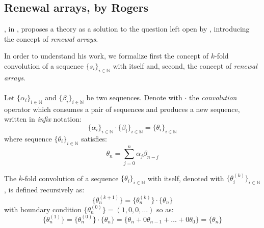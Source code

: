 
\subsection{Renewal arrays, by Rogers}
\label{sec:back:to:the:basics:rogers}

\citeauthor{rogers:1977}, in \cite{rogers:1977}, proposes a theory
as a solution to the question left open by \citeauthor{shapiro:1976}, 
introducing the concept of \emph{renewal arrays}.

In order to understand his work, we formalize first the concept of $k$-fold
convolution of a sequence $\lbrace s_{i}\rbrace_{i\in\mathbb{N}}$ 
with itself and, second, the concept of \emph{renewal arrays}.
\\\\
Let $\lbrace \alpha_{i}\rbrace_{i\in\mathbb{N}}$ and 
$\lbrace \beta_{i}\rbrace_{i\in\mathbb{N}}$ be two sequences. Denote
with $\cdot$ the \emph{convolution} operator which consumes a pair
of sequences and produces a new sequence, written in \emph{infix} 
notation:
\begin{displaymath}
    \lbrace \alpha_{i}\rbrace_{i\in\mathbb{N}}\cdot
    \lbrace \beta_{i}\rbrace_{i\in\mathbb{N}} =
    \lbrace \theta_{i}\rbrace_{i\in\mathbb{N}}
\end{displaymath}
where sequence  $\lbrace \theta_{i}\rbrace_{i\in\mathbb{N}}$ satisfies:
\begin{displaymath}
    \theta_{n}=\sum_{j=0}^{n}{\alpha_{j}\beta_{n-j}}
\end{displaymath}

The $k$-fold convolution of a sequence $\lbrace \theta_{i}\rbrace_{i\in\mathbb{N}}$
with itself, denoted with  $\lbrace \theta_{i}^{(k)}\rbrace_{i\in\mathbb{N}}$, is defined
recursively as:
\begin{displaymath}
    \lbrace\theta_{n}^{(k+1)}\rbrace= \lbrace\theta_{n}^{(k)}\rbrace\cdot
        \lbrace\theta_{n}\rbrace
\end{displaymath}
with boundary condition $\lbrace\theta_{n}^{(0)}\rbrace=(1,0,0,\ldots)$ so as:
\begin{displaymath}
    \lbrace\theta_{n}^{(1)}\rbrace= \lbrace\theta_{n}^{(0)}\rbrace\cdot
        \lbrace\theta_{n}\rbrace=
        \lbrace\theta_{n}+0\theta_{n-1}+\ldots+0\theta_{0}\rbrace=
        \lbrace\theta_{n}\rbrace
\end{displaymath}

